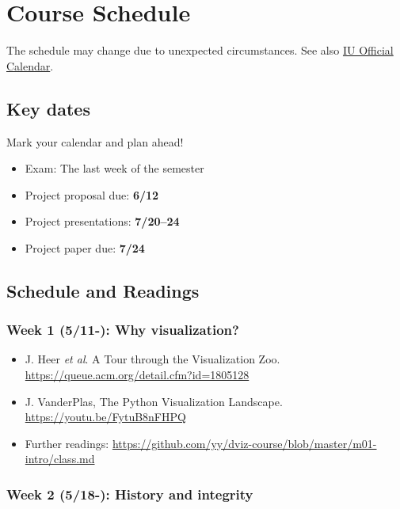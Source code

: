 \documentclass[11pt,article,oneside]{memoir} %
\begin{document}
\clearpage\section{Course Schedule}%

The schedule may change due to unexpected circumstances. See also \href{https://registrar.indiana.edu/official-calendar/index.shtml}{IU Official Calendar}. 

\subsection{Key dates}\label{sub:key_dates} %

Mark your calendar and plan ahead!

\begin{itemize}%
\item Exam: The last week of the semester%
\item Project proposal due: \textbf{6/12}
\item Project presentations: \textbf{7/20--24}
\item Project paper due: \textbf{7/24}
\end{itemize} %

\subsection{Schedule and Readings}\label{sub:schedule}%

\subsubsection{Week 1 (5/11-): Why visualization?} %

\begin{itemize}\itemsep0em 
\item J. Heer \emph{et al}. A Tour through the Visualization Zoo. \url{https://queue.acm.org/detail.cfm?id=1805128}
\item J. VanderPlas, The Python Visualization Landscape. \url{https://youtu.be/FytuB8nFHPQ}
\item Further readings: \url{https://github.com/yy/dviz-course/blob/master/m01-intro/class.md}
\end{itemize}	

\subsubsection{Week 2 (5/18-): History and integrity}%
\end{document}
